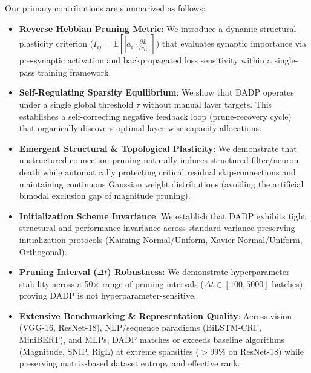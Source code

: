 Our primary contributions are summarized as follows:
\begin{itemize}
    \item \textbf{Reverse Hebbian Pruning Metric}: We introduce a dynamic structural plasticity criterion ($I_{ij} = \mathbb{E}[|a_i \cdot \frac{\partial L}{\partial y_j}|]$) that evaluates synaptic importance via pre-synaptic activation and backpropagated loss sensitivity within a single-pass training framework.
    \item \textbf{Self-Regulating Sparsity Equilibrium}: We show that DADP operates under a single global threshold $\tau$ without manual layer targets. This establishes a self-correcting negative feedback loop (prune-recovery cycle) that organically discovers optimal layer-wise capacity allocations.
    \item \textbf{Emergent Structural \& Topological Plasticity}: We demonstrate that unstructured connection pruning naturally induces structured filter/neuron death while automatically protecting critical residual skip-connections and maintaining continuous Gaussian weight distributions (avoiding the artificial bimodal exclusion gap of magnitude pruning).
    \item \textbf{Initialization Scheme Invariance}: We establish that DADP exhibits tight structural and performance invariance across standard variance-preserving initialization protocols (Kaiming Normal/Uniform, Xavier Normal/Uniform, Orthogonal).
    \item \textbf{Pruning Interval ($\Delta t$) Robustness}: We demonstrate hyperparameter stability across a 50$\times$ range of pruning intervals ($\Delta t \in [100, 5000]$ batches), proving DADP is not hyperparameter-sensitive.
    \item \textbf{Extensive Benchmarking \& Representation Quality}: Across vision (VGG-16, ResNet-18), NLP/sequence paradigms (BiLSTM-CRF, MiniBERT), and MLPs, DADP matches or exceeds baseline algorithms (Magnitude, SNIP, RigL) at extreme sparsities ($>99\%$ on ResNet-18) while preserving matrix-based dataset entropy and effective rank.
\end{itemize}
